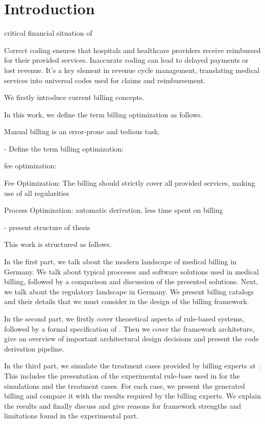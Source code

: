 \chapter{Introduction}\label{ch:introduction}

%

critical financial situation of


Correct coding ensures that hospitals and healthcare providers receive reimbursed for their provided services.
Inaccurate coding can lead to delayed payments or lost revenue.
It's a key element in revenue cycle management, translating medical services into universal codes used for claims and reimbursement.


We firstly introduce current billing concepts.



In this work, we define the term billing optimization as follows.

Manual billing is an error-prone and tedious task.

- Define the term billing optimization:

fee optimization:
\begin{description}
    \item Fee Optimization: The billing should strictly cover all provided services, making use of all regularities
    \item Process Optimization: automatic derivation, less time spent on billing
\end{description}


- present structure of thesis

This work is structured as follows.

In the first part, we talk about the modern landscape of medical billing in Germany.
We talk about typical procceses and software solutions used in medical billing, followed by a comparison and discussion of the presented solutions.
Next, we talk about the regulatory landscape in Germany.
We present billing catalogs and their details that we must consider in the design of the billing framework.

In the second part, we firstly cover theoretical aspects of rule-based systems, followed by a formal specification of \RL.
Then we cover the framework architeture, give an overview of important architectural design decisions and present the code derivation pipeline.

In the third part, we simulate the treatment cases provided by billing experts at \AV.
This includes the presentation of the experimental rule-base used in for the simulations and the treatment cases.
For each case, we present the generated billing and compare it with the results required by the billing experts.
We explain the results and finally discuss and give reasons for framework strengths and limitations found in the experimental part.

